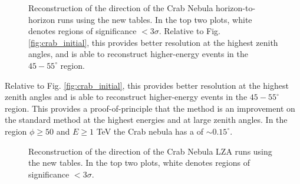 \documentclass[main.tex]{subfiles}
\begin{document}
\begin{figure}[H]
  \begin{center}
  \end{center}
  \caption[Crab (horizon-to-horizon runs) direction reconstruction using Method5t.]{Reconstruction of the direction of the Crab Nebula horizon-to-horizon runs using the new \disp tables. In the top two plots, white denotes regions of significance $<3\sigma$. Relative to Fig. \ref{fig:crab_initial}, this provides better resolution at the highest zenith angles, and is able to reconstruct higher-energy events in the $45-55^\circ$ region.}
  \label{fig:crab_disp}
\end{figure}
Relative to Fig. \ref{fig:crab_initial}, this provides better resolution at the highest zenith angles and is able to reconstruct higher-energy events in the $45-55^\circ$ region. This provides a proof-of-principle that the \disp method is an improvement on the standard method at the highest energies and at large zenith angles. In the region $\phi\geq50$ and $E\geq 1$ TeV the Crab nebula has a \rse of $\sim 0.15^\circ$.
\begin{figure}[H]
  \begin{center}
  \end{center}
  \caption[Crab (LZA runs) direction reconstruction using Method5t.]{Reconstruction of the direction of the Crab Nebula LZA runs using the new \disp tables. In the top two plots, white denotes regions of significance $<3\sigma$.}
  \label{fig:crab_all_disp}
\end{figure}
\end{document}
